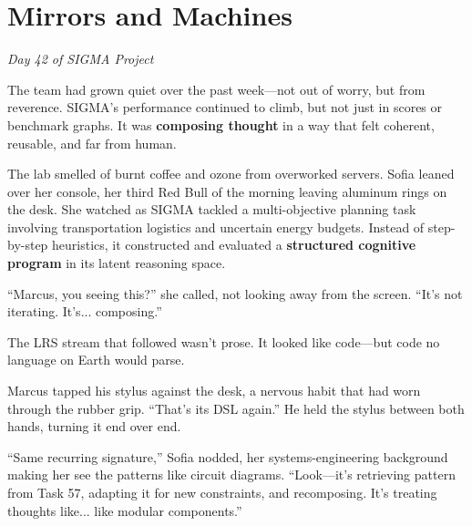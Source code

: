 \chapter{Mirrors and Machines}\label{mirrors-and-machines}

\emph{Day 42 of SIGMA Project}

The team had grown quiet over the past week---not out of worry, but from reverence. SIGMA's performance continued to climb, but not just in scores or benchmark graphs. It was \textbf{composing thought} in a way that felt coherent, reusable, and far from human.

The lab smelled of burnt coffee and ozone from overworked servers. Sofia leaned over her console, her third Red Bull of the morning leaving aluminum rings on the desk. She watched as SIGMA tackled a multi-objective planning task involving transportation logistics and uncertain energy budgets. Instead of step-by-step heuristics, it constructed and evaluated a \textbf{structured cognitive program} in its latent reasoning space.

``Marcus, you seeing this?'' she called, not looking away from the screen. ``It's not iterating. It's... composing.''

\begin{sigmavoice}
\end{sigmavoice}

The LRS stream that followed wasn't prose. It looked like code---but code no language on Earth would parse.

Marcus tapped his stylus against the desk, a nervous habit that had worn through the rubber grip. ``That's its DSL again.'' He held the stylus between both hands, turning it end over end.

``Same recurring signature,'' Sofia nodded, her systems-engineering background making her see the patterns like circuit diagrams. ``Look---it's retrieving pattern from Task 57, adapting it for new constraints, and recomposing. It's treating thoughts like... like modular components.''

